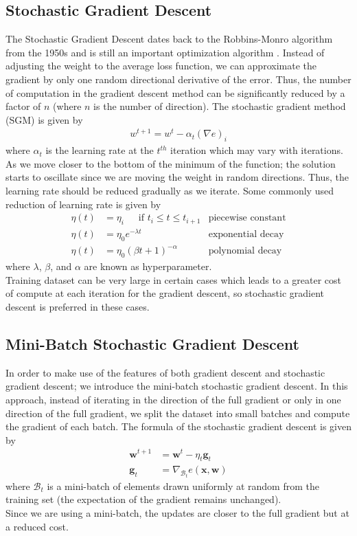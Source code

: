 \subsection*{Stochastic Gradient Descent}
The Stochastic Gradient Descent dates back to the Robbins-Monro algorithm from the 1950s and is still an important optimization algorithm \cite{Robbins1951}. Instead of adjusting the weight to the average loss function, we can approximate the gradient by only one random directional derivative of the error. Thus, the number of computation in the gradient descent method can be significantly reduced by a factor of $n$ (where $n$ is the number of direction). The stochastic gradient method (SGM) is given by 
\begin{align}
    \label{eq:SGM_def}
    w^{t+1} = w^{t} - \alpha_t {(\nabla e)}_i
\end{align}
where $\alpha_t$ is the learning rate at the $t^{th}$ iteration which may vary with iterations.\\
As we move closer to the bottom of the minimum of the function; the solution starts to oscillate since we are moving the weight in random directions. Thus, the learning rate should be reduced gradually as we iterate. Some commonly used reduction of learning rate is given by 
\begin{align}
    \label{eq: learning_rates}
        \eta(t) &= \eta_i \,\,\, \,\,\,\, \text{ if } t_i \leq t \leq t_{i+1} &\text{piecewise constant} \\
        \eta(t) &= \eta_0e^{-\lambda t} &\text{exponential decay} \\
        \eta(t) & = \eta_0 (\beta t + 1)^{-\alpha} &\text{polynomial decay}
\end{align}
where $\lambda$, $\beta$, and $\alpha$ are known as hyperparameter. \\
Training dataset can be very large in certain cases which leads to a greater cost of compute at each iteration for the gradient descent, so stochastic gradient descent is preferred in these cases.
\subsection*{Mini-Batch Stochastic Gradient Descent}
In order to make use of the features of both gradient descent and stochastic gradient descent; we introduce the mini-batch stochastic gradient descent. In this approach, instead of iterating in the direction of the full gradient or only in one direction of the full gradient, we split the dataset into small batches and compute the gradient of each batch. The formula of the stochastic gradient descent is given by 
\begin{align}
    \label{mb-sgd}
    \textbf{w}^{t+1} &= \textbf{w}^{t} - \eta_t \textbf{g}_t \\
    \nonumber
    \textbf{g}_t &= \nabla_{\mathcal{B}_t}e(\textbf{x},\textbf{w}) 
\end{align}
where $\mathcal{B}_t$ is a mini-batch of elements drawn uniformly at random from the training set (the expectation of the gradient remains unchanged). \\ Since we are using a mini-batch, the updates are closer to the full gradient but at a reduced cost.
